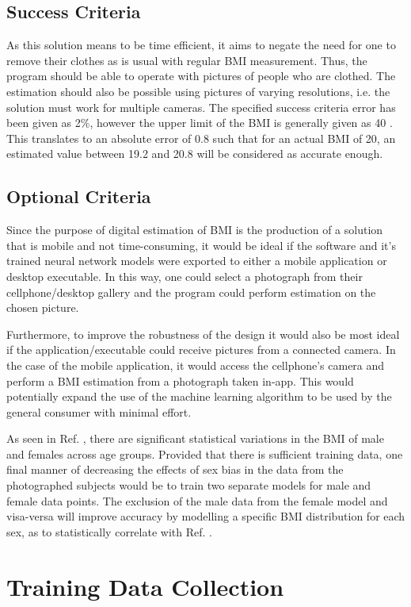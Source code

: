 \documentclass[conference]{IEEEtran}
\begin{document}
\subsection{Success Criteria}
As this solution means to be time efficient, it aims to negate the need for one to remove their clothes as is usual with regular BMI measurement.
Thus, the program should be able to operate with pictures of people who are clothed.
The estimation should also be possible using pictures of varying resolutions, i.e. the solution must work for multiple cameras.
The specified success criteria error has been given as 2\%, however the upper limit of the BMI is generally given as 40 \cite{nhsBMI}. This translates to an absolute error of 0.8 such that for an actual BMI of 20, an estimated value between 19.2 and 20.8 will be considered as accurate enough.
\subsection{Optional Criteria}
Since the purpose of digital estimation of BMI is the production of a solution that is mobile and not time-consuming, it would be ideal if the software and it's trained neural network models were exported to either a mobile application or desktop executable.
In this way, one could select a photograph from their cellphone/desktop gallery and the program could perform estimation on the chosen picture.

Furthermore, to improve the robustness of the design it would also be most ideal if the application/executable could receive pictures from a connected camera.
In the case of the mobile application, it would access the cellphone's camera and perform a BMI estimation from a photograph taken in-app.
This would potentially expand the use of the machine learning algorithm to be used by the general consumer with minimal effort.

As seen in Ref. \cite{bmiage}, there are significant statistical variations in the BMI of male and females across age groups.
Provided that there is sufficient training data, one final manner of decreasing the effects of sex bias in the data from the photographed subjects would be to train two separate models for male and female data points.
The exclusion of the male data from the female model and visa-versa will improve accuracy by modelling a specific BMI distribution for each sex, as to statistically correlate with Ref. \cite{bmiage}.
\section{Training Data Collection}
\end{document}
